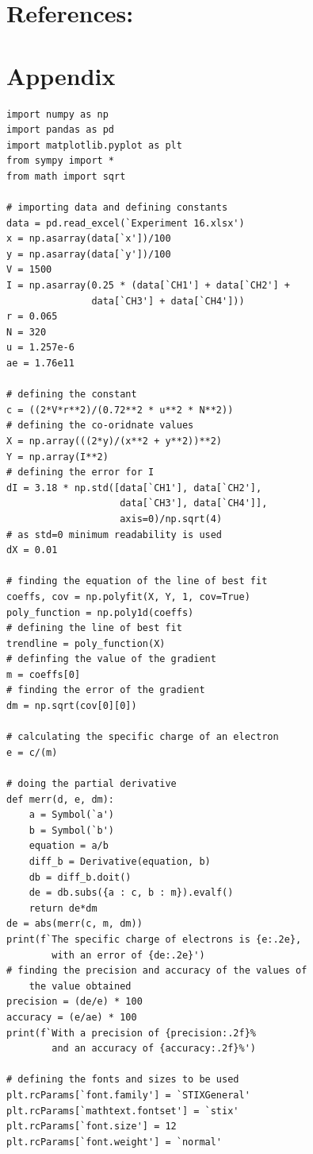 \documentclass[12pt, a4paper]{article}
\begin{document}
\section*{References:}
\printbibliography[heading=none]

\section*{Appendix}
\lstset{language=Python,
    showstringspaces=false,
    showtabs=false}
\begin{lstlisting}
import numpy as np
import pandas as pd
import matplotlib.pyplot as plt
from sympy import *
from math import sqrt

# importing data and defining constants
data = pd.read_excel(`Experiment 16.xlsx')
x = np.asarray(data[`x'])/100
y = np.asarray(data[`y'])/100
V = 1500
I = np.asarray(0.25 * (data[`CH1'] + data[`CH2'] + 
               data[`CH3'] + data[`CH4']))
r = 0.065
N = 320
u = 1.257e-6
ae = 1.76e11

# defining the constant
c = ((2*V*r**2)/(0.72**2 * u**2 * N**2))
# defining the co-oridnate values
X = np.array(((2*y)/(x**2 + y**2))**2)
Y = np.array(I**2)
# defining the error for I
dI = 3.18 * np.std([data[`CH1'], data[`CH2'], 
                    data[`CH3'], data[`CH4']],
                    axis=0)/np.sqrt(4)
# as std=0 minimum readability is used
dX = 0.01

# finding the equation of the line of best fit
coeffs, cov = np.polyfit(X, Y, 1, cov=True)
poly_function = np.poly1d(coeffs)
# defining the line of best fit
trendline = poly_function(X)
# definfing the value of the gradient
m = coeffs[0]
# finding the error of the gradient
dm = np.sqrt(cov[0][0])

# calculating the specific charge of an electron
e = c/(m)

# doing the partial derivative
def merr(d, e, dm):
    a = Symbol(`a')
    b = Symbol(`b')
    equation = a/b
    diff_b = Derivative(equation, b)
    db = diff_b.doit()
    de = db.subs({a : c, b : m}).evalf()
    return de*dm
de = abs(merr(c, m, dm))
print(f`The specific charge of electrons is {e:.2e}, 
        with an error of {de:.2e}')
# finding the precision and accuracy of the values of 
    the value obtained
precision = (de/e) * 100
accuracy = (e/ae) * 100
print(f`With a precision of {precision:.2f}% 
        and an accuracy of {accuracy:.2f}%')

# defining the fonts and sizes to be used
plt.rcParams[`font.family'] = `STIXGeneral'
plt.rcParams[`mathtext.fontset'] = `stix'
plt.rcParams[`font.size'] = 12
plt.rcParams[`font.weight'] = `normal'


\end{lstlisting}
\end{document}
